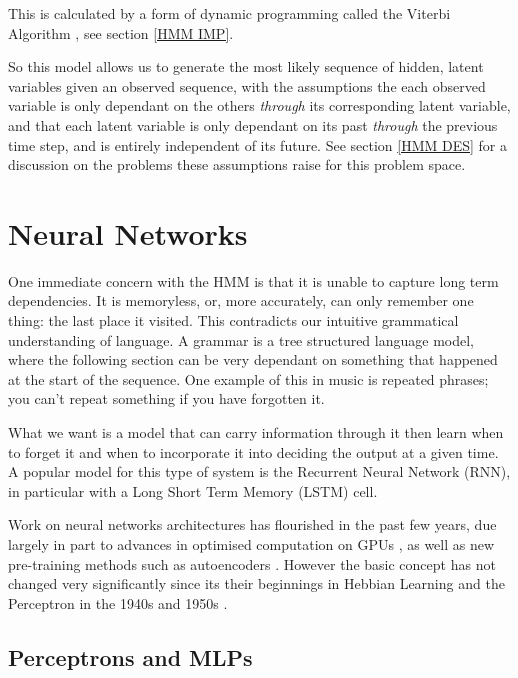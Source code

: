 \documentclass[bsc,singlespacing,logo, parskip, deptreport]{infthesis}
\begin{document}
This is calculated by a form of dynamic programming called the Viterbi Algorithm \cite{russell2002artificial}, see section \ref{HMM IMP}.

So this model allows us to generate the most likely sequence of hidden, latent variables given an observed sequence, with the assumptions the each observed variable is only dependant on the others {\em through} its corresponding latent variable, and that each latent variable is only dependant on its past {\em through} the previous time step, and is entirely independent of its future. See section \ref{HMM DES} for a discussion on the problems these assumptions raise for this problem space.

\section{Neural Networks}

One immediate concern with the HMM is that it is unable to capture long term dependencies. It is memoryless, or, more accurately, can only remember one thing: the last place it visited. This contradicts our intuitive grammatical understanding of language. A grammar is a tree structured language model, where the following section can be very dependant on something that happened at the start of the sequence. One example of this in music is repeated phrases; you can't repeat something if you have forgotten it.

What we want is a model that can carry information through it then learn when to forget it and when to incorporate it into deciding the output at a given time. A popular model for this type of system is the Recurrent Neural Network (RNN), in particular with a Long Short Term Memory (LSTM) cell.

Work on neural networks architectures has flourished in the past few years, due largely in part to advances in optimised computation on GPUs \cite{oh2004gpu}\cite{krizhevsky2012imagenet}, as well as new pre-training methods such as autoencoders \cite{hinton2006reducing}\cite{vincent2008extracting}\cite{deng2010binary}. However the basic concept has not changed very significantly since its their beginnings in Hebbian Learning and the Perceptron in the 1940s and 1950s \cite{hebb1949first} \cite{rosenblatt1958perceptron}.

\subsection{Perceptrons and MLPs}
\end{document}
